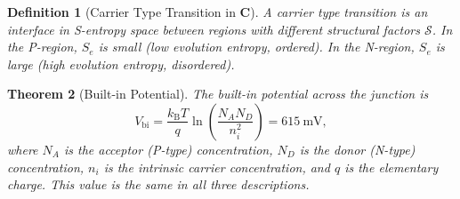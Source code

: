 \documentclass[twocolumn,10pt]{article}
\newtheorem{theorem}{Theorem}[section]
\newtheorem{definition}[theorem]{Definition}
\theoremstyle{remark}
\newcommand{\kB}{k_{\mathrm{B}}}
\newcommand{\Se}{S_e}
\newcommand{\CatC}{\mathbf{C}}
\begin{document}
\begin{definition}[Carrier Type Transition in $\CatC$]
\label{def:pn_C}
A \emph{carrier type transition} is an interface in S-entropy space between regions with different structural factors $\mathcal{S}$.
In the P-region, $\Se$ is small (low evolution entropy, ordered).
In the N-region, $\Se$ is large (high evolution entropy, disordered).
\end{definition}

\begin{theorem}[Built-in Potential]
\label{thm:vbi}
The built-in potential across the junction is
\begin{equation}
V_{\mathrm{bi}} = \frac{\kB T}{q}\ln\!\left(\frac{N_A N_D}{n_i^2}\right) = \SI{615}{\milli\volt},
\label{eq:vbi}
\end{equation}
where $N_A$ is the acceptor (P-type) concentration, $N_D$ is the donor (N-type) concentration, $n_i$ is the intrinsic carrier concentration, and $q$ is the elementary charge.
This value is the same in all three descriptions.
\end{theorem}
\end{document}

